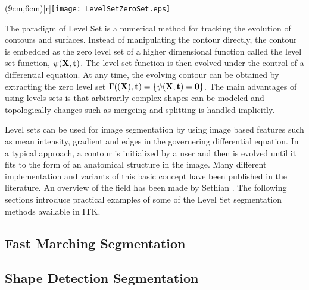 %
%
% 
%
%
%



\parpic(9cm,6cm)[r]{\texttt{[image: LevelSetZeroSet.eps]}}

The paradigm of Level Set is a numerical method for tracking the evolution of
contours and surfaces. Instead of manipulating the contour directly, the
contour is embedded as the zero level set of a higher dimensional function
called the level set function, $\psi(\bf{X},t)$. The level set function is then
evolved under the control of a differential equation. At any time, the evolving
contour can be obtained by extracting the zero level set $\Gamma(\bf(X),t) =
\{\psi(\bf{X},t) = 0\}$.  The main advantages of using levels sets is that
arbitrarily complex shapes can be modeled and topologically changes such as
mergeing and splitting is handled implicitly.

Level sets can be used for image segmentation by using image based features such
as mean intensity, gradient and edges in the governering differential equation. 
In a typical approach, a contour is initialized by a user and then is evolved 
until it fits to the form of an anatomical structure in the image. 
Many different implementation and variants of this basic concept have been
published in the literature. An overview of the field has been made by Sethian
\cite{Sethian1996}. The following sections introduce practical examples of some
of the Level Set segmentation methods available in ITK.


\subsection{Fast Marching Segmentation}
\label{sec:FastMarchingImageFilter}

\ifitkFullVersion

\fi



\subsection{Shape Detection Segmentation}
\label{sec:ShapeDetectionLevelSetFilter}

